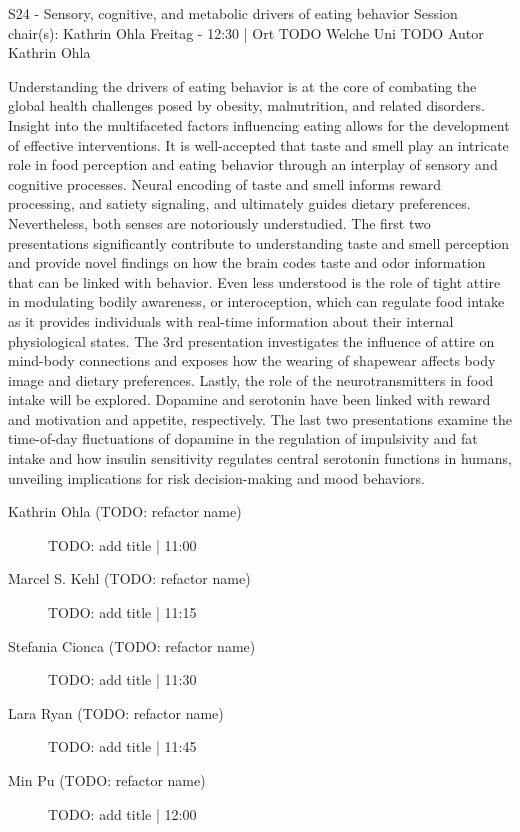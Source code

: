 
            \begin{symposium}
            {S24 - Sensory, cognitive, and metabolic drivers of eating behavior}
            {Session chair(s): Kathrin Ohla}
            {Freitag  - 12:30 | Ort TODO}
            {Welche Uni TODO}
            Autor Kathrin Ohla

Understanding the drivers of eating behavior is at the core of combating the global health challenges posed by obesity, malnutrition, and related disorders. Insight into the multifaceted factors influencing eating allows for the development of effective interventions. It is well-accepted that taste and smell play an intricate role in food perception and eating behavior through an interplay of sensory and cognitive processes. Neural encoding of taste and smell informs reward processing, and satiety signaling, and ultimately guides dietary preferences. Nevertheless, both senses are notoriously understudied. The first two presentations significantly contribute to understanding taste and smell perception and provide novel findings on how the brain codes taste and odor information that can be linked with behavior.
Even less understood is the role of tight attire in modulating bodily awareness, or interoception, which can regulate food intake as it provides individuals with real-time information about their internal physiological states. The 3rd presentation investigates the influence of attire on mind-body connections and exposes how the wearing of shapewear affects body image and dietary preferences. Lastly, the role of the neurotransmitters in food intake will be explored. Dopamine and serotonin have been linked with reward and motivation and appetite, respectively. The last two presentations examine the time-of-day fluctuations of dopamine in the regulation of impulsivity and fat intake and how insulin sensitivity regulates central serotonin functions in humans, unveiling implications for risk decision-making and mood behaviors.
            \begin{description}    
            
                \item [Kathrin Ohla (TODO: refactor name)] TODO: add title \textcolor{mygray}{ | 11:00}    
                
                \item [Marcel S. Kehl (TODO: refactor name)] TODO: add title \textcolor{mygray}{ | 11:15}    
                
                \item [Stefania Cionca (TODO: refactor name)] TODO: add title \textcolor{mygray}{ | 11:30}    
                
                \item [Lara Ryan (TODO: refactor name)] TODO: add title \textcolor{mygray}{ | 11:45}    
                
                \item [Min Pu  (TODO: refactor name)] TODO: add title \textcolor{mygray}{ | 12:00}    
                
            \end{description} 
            \end{symposium}
            